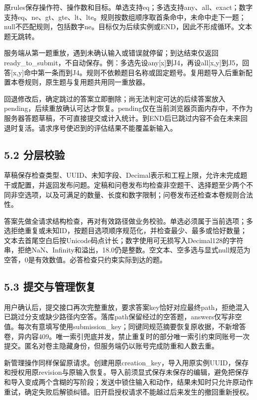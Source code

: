 原rules保存操作符、操作数和目标。单选支持eq；多选支持any、all、exact；数字支持eq、ne、gt、gte、lt、lte。规则按数组顺序取首条命中，未命中走下一题；null不匹配规则，包括数字ne。目标仅为后续实例或END，因此不形成循环。文本题无跳转。

服务端从第一题重放，遇到未确认输入或错误就停留；到达结束仅返回ready\_to\_submit，不自动保存。例：多选先设any{[}x{]}到J4，再设all{[}x,y{]}到J5，回答{[}x,y{]}命中第一条而到J4。规则不依赖题目名称或固定题号。复用题导入后重新配置本卷规则，原生题与复用题共用同一重放器。

回退修改后，确定跳过的答案立即删除；尚无法判定可达的后续答案放入pending，后续重放确认可达才恢复。pending仅在当前浏览器页面内存中，不作为服务器答题草稿，不可直接提交或计入统计。到END后已跳过内容不会在未来回退时复活。请求序号使迟到的评估结果不能覆盖新输入。

\subsection{5.2 分层校验}\label{ux5206ux5c42ux6821ux9a8c}

草稿保存检查类型、UUID、未知字段、Decimal表示和工程上限，允许未完成题干或配置，并返回发布问题。定稿和问卷发布均检查非空题干、选择题至少两个不同非空选项，以及可满足的数量、长度和数字限制；问卷发布还检查本卷规则合法性。

答案先做全请求结构检查，再对有效路径做业务校验。单选必须属于当前选项；多选拒绝重复或未知ID，按题目选项顺序规范化，并检查最少、最多或恰好数量；文本去首尾空白后按Unicode码点计长；数字使用可无损写入Decimal128的字符串，拒绝NaN、Infinity和溢出，18.0仍是整数。空文本、空多选与显式null规范为空答，0是有效数值。必答检查只约束实际到达的题。

\subsection{5.3 提交与管理恢复}\label{ux63d0ux4ea4ux4e0eux7ba1ux7406ux6062ux590d}

用户确认后，提交接口再次完整重放，要求答案key恰好对应最终path，拒绝混入已跳过分支或缺少路径内空答。落库path保留经过的空答题，answers仅写非空值。每次有意填写使用submission\_key；同键同规范摘要恢复原收据，不新增答卷，异内容409。唯一索引兜底并发，禁止重复时的部分唯一索引约束同账号一次提交。匿名对卷主隐藏身份，但服务端仍以账号完成防重和人数去重。

新管理操作同样保留原请求。创建用原creation\_key，导入用原实例UUID，保存和授权用原revision与原输入恢复。导入前须显式保存未保存的编辑，避免把保存和导入变成两个含糊的写阶段；发送中锁住输入和动作，结果未知时只允许原动作重试，确定失败后解锁纠错。旧开启授权请求不能越过后来发生的撤回重新授权。

